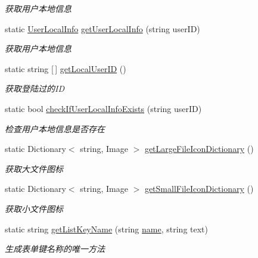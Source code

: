 \begin{DoxyCompactItemize}
\begin{DoxyCompactList}\small\item\em 获取用户本地信息 \end{DoxyCompactList}\item 
static \hyperlink{classcustom__cloud_1_1_user_local_info}{User\+Local\+Info} \hyperlink{classcustom__cloud_1_1_my_config_a2e476408160fad0ae7debb5d156cc3b0}{get\+User\+Local\+Info} (string user\+ID)
\begin{DoxyCompactList}\small\item\em 获取用户本地信息 \end{DoxyCompactList}\item 
static string \mbox{[}$\,$\mbox{]} \hyperlink{classcustom__cloud_1_1_my_config_aabb9bfe46a6d68631ab388023d1f2c7b}{get\+Local\+User\+ID} ()
\begin{DoxyCompactList}\small\item\em 获取登陆过的\+ID \end{DoxyCompactList}\item 
static bool \hyperlink{classcustom__cloud_1_1_my_config_ac64ce751a9b83a56a8ad6cfcbf7b1e38}{check\+If\+User\+Local\+Info\+Exists} (string user\+ID)
\begin{DoxyCompactList}\small\item\em 检查用户本地信息是否存在 \end{DoxyCompactList}\item 
static Dictionary$<$ string, Image $>$ \hyperlink{classcustom__cloud_1_1_my_config_ad7d937041ae6ee8c716233eaf8a394fd}{get\+Large\+File\+Icon\+Dictionary} ()
\begin{DoxyCompactList}\small\item\em 获取大文件图标 \end{DoxyCompactList}\item 
static Dictionary$<$ string, Image $>$ \hyperlink{classcustom__cloud_1_1_my_config_a11778cc1e96d5fb0f0aecf7cff529b26}{get\+Small\+File\+Icon\+Dictionary} ()
\begin{DoxyCompactList}\small\item\em 获取小文件图标 \end{DoxyCompactList}\item 
static string \hyperlink{classcustom__cloud_1_1_my_config_a8d96b3dd46dfb4087fd026debdaadd2e}{get\+List\+Key\+Name} (string \hyperlink{utility_8cpp_a8f8f80d37794cde9472343e4487ba3eb}{name}, string text)
\begin{DoxyCompactList}\small\item\em 生成表单键名称的唯一方法 \end{DoxyCompactList}\end{DoxyCompactItemize}
